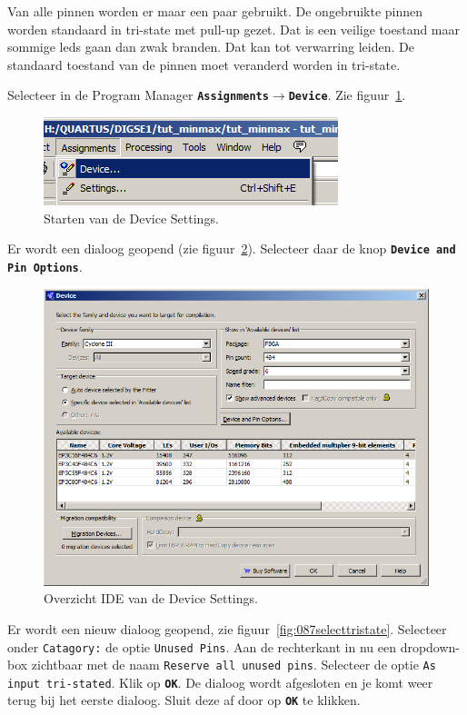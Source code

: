 \documentclass[a4paper,12pt,fleqn,twoside]{book}
\def\tutpicscale{0.455}
\newcommand{\menu}[1]{\texttt{\textbf{#1}}}
\newcommand{\naam}[1]{\texttt{#1}}
\def\pijl{$\rightarrow$}%
\begin{document}
Van alle pinnen worden er maar een paar gebruikt. De ongebruikte pinnen worden standaard in 
tri-state met pull-up gezet. Dat is een veilige toestand maar sommige leds gaan dan zwak 
branden. Dat kan tot verwarring leiden. De standaard toestand van de pinnen moet veranderd 
worden in tri-state.

Selecteer in de Program Manager \menu{Assignments\pijl{}Device}. Zie figuur~\ref{fig:085assignmentsdevice}.
 
\begin{figure}[H]
\centering
\includegraphics[scale=\tutpicscale]{085assignmentsdevice.png}
\caption{Starten van de Device Settings.}
\label{fig:085assignmentsdevice}
\end{figure}

Er wordt een dialoog geopend (zie figuur~\ref{fig:086deviceoverview}).
Selecteer daar de knop \menu{Device and Pin Options}.

\begin{figure}[H]
\centering
\includegraphics[scale=\tutpicscale]{086Zdeviceoverview.png}
\caption{Overzicht IDE van de Device Settings.}
\label{fig:086deviceoverview}
\end{figure}
 
Er wordt een nieuw dialoog geopend, zie figuur~\ref{fig:087selecttristate}.
Selecteer onder \naam{Catagory:} de optie 
\naam{Unused Pins}. Aan de rechterkant in nu een dropdown-box zichtbaar
met de naam \naam{Reserve all unused pins}.
Selecteer de optie \naam{As input tri-stated}. Klik op \menu{OK}. De dialoog wordt afgesloten en je 
komt weer terug bij het eerste dialoog. Sluit deze af door op \menu{OK} te klikken.
\end{document}
